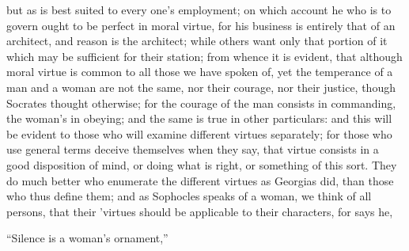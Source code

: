 but as is best suited to every one's employment; on which account he who
is to govern ought to be perfect in moral virtue, for his business is
entirely that of an architect, and reason is the architect; while others
want only that portion of it which may be sufficient for their station;
from whence it is evident, that although moral virtue is common to all
those we have spoken of, yet the temperance of a man and a woman are not
the same, nor their courage, nor their justice, though Socrates thought
otherwise; for the courage of the man consists in commanding, the woman's
in obeying; and the same is true in other particulars: and this will be
evident to those who will examine different virtues separately; for those
who use general terms deceive themselves when they say, that virtue
consists in a good disposition of mind, or doing what is right, or
something of this sort. They do much better who enumerate the different
virtues as Georgias did, than those who thus define them; and as Sophocles
speaks of a woman, we think of all persons, that their 'virtues should be
applicable to their characters, for says he,

``Silence is a woman's ornament,''

